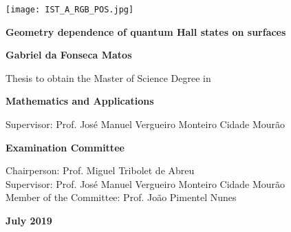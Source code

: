 \documentclass[notas.tex]{subfiles} 				%
\begin{document}
	\begin{titlepage}
		\hspace*{-2.9cm}\texttt{[image: IST\_A\_RGB\_POS.jpg]}\par
		\centering
		{\fontsize{16pt}{24pt}\selectfont\textbf{Geometry dependence of quantum Hall states on surfaces}\par}
		{\fontsize{14pt}{21pt}\selectfont\textbf{Gabriel da Fonseca Matos}\par}
		\vfill
		{\fontsize{12pt}{16pt}\selectfont Thesis to obtain the Master of Science Degree in \par}
		{\fontsize{16pt}{24pt}\selectfont\textbf{Mathematics and Applications}\par}
		\vfill
		{\fontsize{12pt}{16pt}\selectfont Supervisor: Prof. José Manuel Vergueiro Monteiro Cidade Mourão\par}
		\vfill
		{\fontsize{14pt}{21pt}\selectfont\textbf{Examination Committee}\par}
		{\fontsize{12pt}{16pt}\selectfont Chairperson: Prof. Miguel Tribolet de Abreu\\
		Supervisor: Prof. José Manuel Vergueiro Monteiro Cidade Mourão\\
		Member of the Committee: Prof. João Pimentel Nunes\par}
		\vfill
		{\fontsize{14pt}{14pt}\selectfont\textbf{July 2019}\par}
	\end{titlepage}
\end{document}

